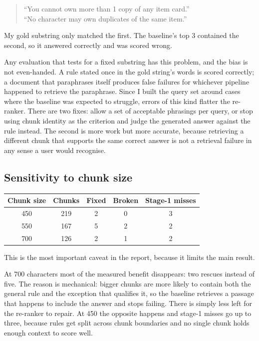 \documentclass[11pt,a4paper]{article}
\begin{document}
\begin{quote}
``You cannot own more than 1 copy of any item card.'' \\
``No character may own duplicates of the same item.''
\end{quote}

My gold substring only matched the first. The baseline's top 3 contained the second, so it
answered correctly and was scored wrong.

Any evaluation that tests for a fixed substring has this problem, and the bias is not
even-handed. A rule stated once in the gold string's words is scored correctly; a document
that paraphrases itself produces false failures for whichever pipeline happened to retrieve
the paraphrase. Since I built the query set around cases where the baseline was expected to
struggle, errors of this kind flatter the re-ranker. There are two fixes: allow a set of
acceptable phrasings per query, or stop using chunk identity as the criterion and judge the
generated answer against the rule instead. The second is more work but more accurate, because
retrieving a different chunk that supports the same correct answer is not a retrieval failure
in any sense a user would recognise.

\subsection{Sensitivity to chunk size}

\begin{tabular}{ccccc}
\toprule
Chunk size & Chunks & Fixed & Broken & Stage-1 misses \\
\midrule
450 & 219 & 2 & 0 & 3 \\
550 & 167 & 5 & 2 & 2 \\
700 & 126 & 2 & 1 & 2 \\
\bottomrule
\end{tabular}

\medskip
{}

\medskip
This is the most important caveat in the report, because it limits the main result.

At 700 characters most of the measured benefit disappears: two rescues instead of five. The
reason is mechanical: bigger chunks are more likely to contain both the general rule and the
exception that qualifies it, so the baseline retrieves a passage that happens to include the
answer and stops failing. There is simply less left for the re-ranker to repair. At 450 the
opposite happens and stage-1 misses go up to three, because rules get split across chunk
boundaries and no single chunk holds enough context to score well.
\end{document}
